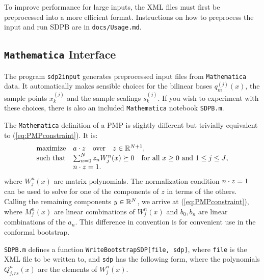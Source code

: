 \documentclass[12pt]{article}
\numberwithin{equation}{section}
\renewcommand{\be}{\begin{eqnarray}}
\renewcommand{\ee}{\end{eqnarray}}
\begin{document}
To improve performance for large inputs, the XML files must first be
preprocessed into a more efficient format.  Instructions on how to
preprocess the input and run SDPB are in \texttt{docs/Usage.md}.

\subsection{\texttt{Mathematica} Interface}

The program \texttt{sdp2input} generates preprocessed input files from \texttt{Mathematica} data.
It automatically makes sensible choices for the bilinear bases
$q_m^{(j)}(x)$, the sample points $x_k^{(j)}$ and the sample scalings
$s_k^{(j)}$.  If you wish to experiment with these choices, there is
also an included \texttt{Mathematica} notebook \texttt{SDPB.m}.

The \texttt{Mathematica} definition of a PMP is slightly different but trivially equivalent to (\ref{eq:PMPconstraint}).  It is:
\be
\label{eq:PMPconstraintMathematica}
\begin{array}{ll}
\textrm{maximize} & a\.z\quad\textrm{over}\quad z \in \R^{N+1},\\
\textrm{such that} & \sum_{n=0}^{N} z_n W^n_j(x) \succeq 0 \quad \textrm{for all $x\geq 0$ and $1 \leq j \leq J$},\\
 & n\.z = 1.
\end{array}
\ee
where $W_j^n(x)$ are matrix polynomials.  The normalization condition $n\.z=1$ can be used to solve for one of the components of $z$ in terms of the others.  Calling the remaining components $y\in \R^N$, we arrive at (\ref{eq:PMPconstraint}), where $M_j^n(x)$ are linear combinations of $W^n_j(x)$ and $b_0,b_n$ are linear combinations of the $a_n$.  This difference in convention is for convenient use in the conformal bootstrap.

\texttt{SDPB.m} defines a function \texttt{WriteBootstrapSDP[file, sdp]}, where \texttt{file} is the XML file to be written to, and \texttt{sdp} has the following form, where the polynomials $Q^n_{j,rs}(x)$ are the elements of $W_j^n(x)$.
\end{document}
